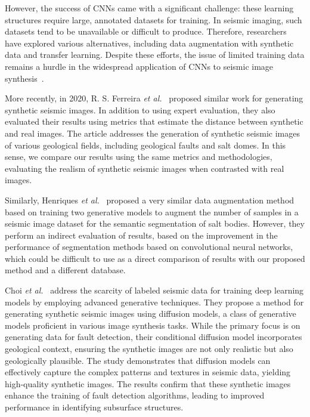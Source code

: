 \documentclass{ieeeaccess}
\begin{document}
However, the success of CNNs came with a significant challenge: these learning structures require large, annotated datasets for training. In seismic imaging, such datasets tend to be unavailable or difficult to produce. Therefore, researchers have explored various alternatives, including data augmentation with synthetic data and transfer learning. Despite these efforts, the issue of limited training data remains a hurdle in the widespread application of CNNs to seismic image synthesis~\cite{Wang2021}.

More recently, in 2020, R. S. Ferreira \emph{et al.}~\cite{Ferreira2020} proposed similar work for generating synthetic seismic images. In addition to using expert evaluation, they also evaluated their results using metrics that estimate the distance between synthetic and real images. The article addresses the generation of synthetic seismic images of various geological fields, including geological faults and salt domes. In this sense, we compare our results using the same metrics and methodologies, evaluating the realism of synthetic seismic images when contrasted with real images.

Similarly, Henriques \emph{et al.}~\cite{Henriques2021} proposed a very similar data augmentation method based on training two generative models to augment the number of samples in a seismic image dataset for the semantic segmentation of salt bodies. However, they perform an indirect evaluation of results, based on the improvement in the performance of segmentation methods based on convolutional neural networks, which could be difficult to use as a direct comparison of results with our proposed method and a different database.

Choi \emph{et al.}~\cite{Choi2025} address the scarcity of labeled seismic data for training deep learning models by employing advanced generative techniques. They propose a method for generating synthetic seismic images using diffusion models, a class of generative models proficient in various image synthesis tasks. While the primary focus is on generating data for fault detection, their conditional diffusion model incorporates geological context, ensuring the synthetic images are not only realistic but also geologically plausible. The study demonstrates that diffusion models can effectively capture the complex patterns and textures in seismic data, yielding high-quality synthetic images. The results confirm that these synthetic images enhance the training of fault detection algorithms, leading to improved performance in identifying subsurface structures.
\end{document}
